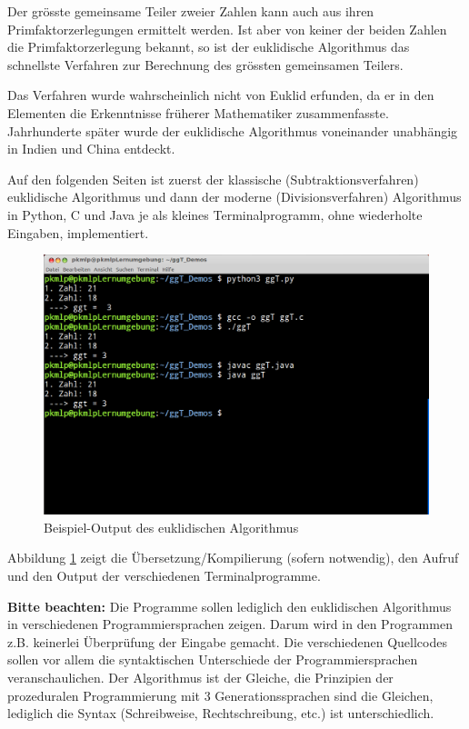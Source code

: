 Der grösste gemeinsame Teiler zweier Zahlen kann auch aus ihren Primfaktorzerlegungen ermittelt werden. Ist aber von keiner der beiden Zahlen die Primfaktorzerlegung bekannt, so ist der euklidische Algorithmus das schnellste Verfahren zur Berechnung des grössten gemeinsamen Teilers.

Das Verfahren wurde wahrscheinlich nicht von Euklid erfunden, da er in den Elementen die Erkenntnisse früherer Mathematiker zusammenfasste. Jahrhunderte später wurde der euklidische Algorithmus voneinander unabhängig in Indien und China entdeckt. 

\newpage 
Auf den folgenden Seiten ist zuerst der klassische (Subtraktionsverfahren) euklidische Algorithmus und dann der moderne (Divisionsverfahren) Algorithmus in Python,  C und  Java je als kleines Terminalprogramm, ohne wiederholte Eingaben, implementiert.  

\begin{figure}[h!]
  \includegraphics[width=\linewidth]{./screenshots/ggT.png}
  \vspace{-14pt}
  \caption{Beispiel-Output des euklidischen Algorithmus}
  \label{fig:ggT}
\end{figure}

Abbildung \ref{fig:ggT} zeigt die Übersetzung/Kompilierung (sofern notwendig), den Aufruf und den Output der verschiedenen Terminalprogramme.

\textbf{Bitte beachten:} Die Programme sollen lediglich den euklidischen Algorithmus in verschiedenen Programmiersprachen zeigen. Darum wird in den Programmen z.B. keinerlei Überprüfung der Eingabe gemacht. Die verschiedenen Quellcodes sollen vor allem die syntaktischen Unterschiede der Programmiersprachen veranschaulichen. Der Algorithmus ist der Gleiche, die Prinzipien der prozeduralen Programmierung mit 3 Generationssprachen sind die Gleichen, lediglich die Syntax (Schreibweise, Rechtschreibung, etc.) ist unterschiedlich.
